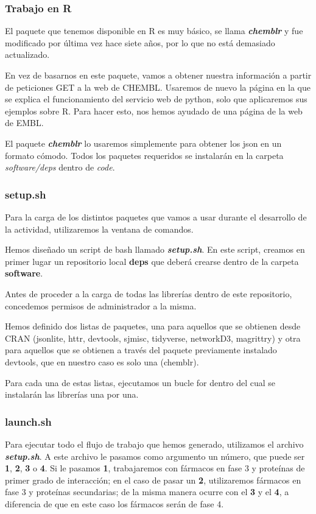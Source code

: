 \subsubsection{Trabajo en R}
El paquete que tenemos disponible en R es muy básico, se llama \textbf{\textit{chemblr}} y fue modificado por última vez hace siete años, por lo que no está demasiado actualizado. %

En vez de basarnos en este paquete, vamos a obtener nuestra información a partir de peticiones GET a la web de CHEMBL. Usaremos de nuevo la página en la que se explica el funcionamiento del servicio web de python, solo que aplicaremos sus ejemplos sobre R. Para hacer esto, nos hemos ayudado de una página de la web de EMBL.  %

El paquete \textbf{\textit{chemblr}} lo usaremos simplemente para obtener los json en un formato cómodo. Todos los paquetes requeridos se instalarán en la carpeta \textit{software/deps} dentro de \textit{code}.

\subsubsection{setup.sh}
Para la carga de los distintos paquetes que vamos a usar durante el desarrollo de la actividad, utilizaremos la ventana de comandos. 

Hemos diseñado un script de bash llamado \textbf{\textit{setup.sh}}. En este script, creamos en primer lugar un repositorio local \textbf{deps} que deberá crearse dentro de la carpeta \textbf{software}. 

Antes de proceder a la carga de todas las librerías dentro de este repositorio, concedemos permisos de administrador a la misma. 

Hemos definido dos listas de paquetes, una para aquellos que se obtienen desde CRAN (jsonlite, httr, devtools, sjmisc, tidyverse, networkD3, magrittry) y  otra para aquellos que se obtienen a través del paquete previamente instalado devtools, que en nuestro caso es solo una (chemblr). 

Para cada una de estas listas, ejecutamos un bucle for dentro del cual se instalarán las librerías una por una. 

\subsubsection{launch.sh}
Para ejecutar todo el flujo de trabajo que hemos generado, utilizamos el archivo \textbf{\textit{setup.sh}}. A este archivo le pasamos como argumento un número, que puede ser \textbf{1}, \textbf{2}, \textbf{3} o \textbf{4}. Si le pasamos \textbf{1}, trabajaremos con fármacos en fase 3 y proteínas de primer grado de interacción; en el caso de pasar un \textbf{2}, utilizaremos fármacos en fase 3 y proteínas secundarias; de la misma manera ocurre con el \textbf{3} y el \textbf{4}, a diferencia de que en este caso los fármacos serán de fase 4. 

